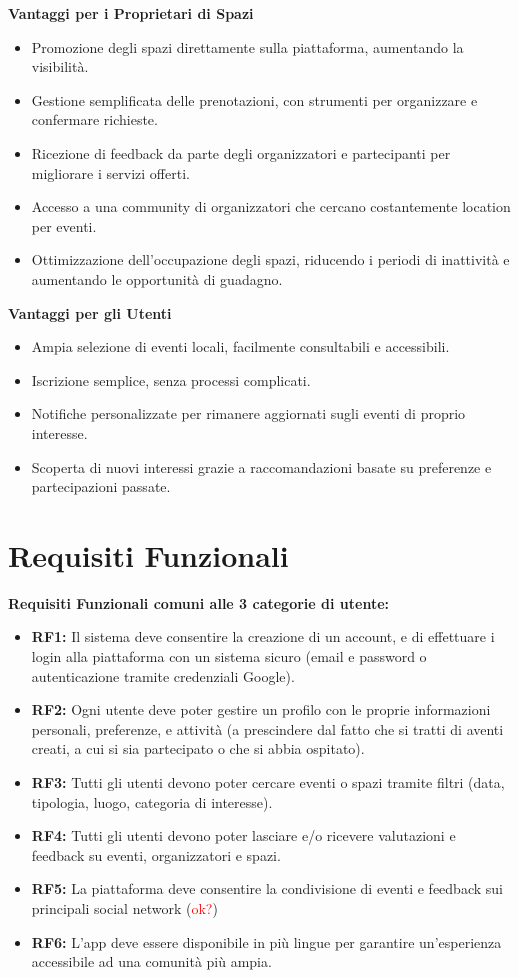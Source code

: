 \documentclass[9pt]{extarticle}
\begin{document}
\textbf{Vantaggi per i Proprietari di Spazi}
\begin{itemize}
	\item Promozione degli spazi direttamente sulla piattaforma, aumentando la visibilità.
	\item Gestione semplificata delle prenotazioni, con strumenti per organizzare e confermare richieste.
	\item Ricezione di feedback da parte degli organizzatori e partecipanti per migliorare i servizi offerti.
	\item Accesso a una community di organizzatori che cercano costantemente location per eventi.
	\item Ottimizzazione dell'occupazione degli spazi, riducendo i periodi di inattività e aumentando le opportunità di guadagno.
\end{itemize}

\textbf{Vantaggi per gli Utenti}
\begin{itemize}
	\item Ampia selezione di eventi locali, facilmente consultabili e accessibili.
	\item Iscrizione semplice, senza processi complicati.
	\item Notifiche personalizzate per rimanere aggiornati sugli eventi di proprio interesse.
	\item Scoperta di nuovi interessi grazie a raccomandazioni basate su preferenze e partecipazioni passate.
\end{itemize}

\section{Requisiti Funzionali}

\textbf{Requisiti Funzionali comuni alle 3 categorie di utente:}
\begin{itemize}
	\item \textbf{RF1:} Il sistema deve consentire la creazione di un account, e di effettuare i login alla piattaforma con un sistema sicuro (email e password o autenticazione tramite credenziali Google).
	\item \textbf{RF2:} Ogni utente deve poter gestire un profilo con le proprie informazioni personali, preferenze, e attività (a prescindere dal fatto che si tratti di aventi creati, a cui si sia partecipato o che si abbia ospitato).
	\item \textbf{RF3:} Tutti gli utenti devono poter cercare eventi o spazi tramite filtri (data, tipologia, luogo, categoria di interesse).
	\item \textbf{RF4:} Tutti gli utenti devono poter lasciare e/o ricevere valutazioni e feedback su eventi, organizzatori e spazi.
	\item \textbf{RF5:} La piattaforma deve consentire la condivisione di eventi e feedback sui principali social network (\textcolor{red}{ok?})
	\item \textbf{RF6:} L'app deve essere disponibile in più lingue per garantire un'esperienza accessibile ad una comunità più ampia.	
\end{itemize}
\end{document}
